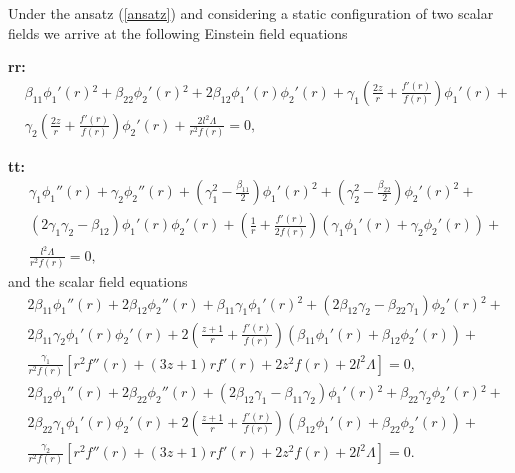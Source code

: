 \documentclass[sn-mathphys,Numbered]{sn-jnl}%
\theoremstyle{thmstyleone}%
\theoremstyle{thmstyletwo}%
\theoremstyle{thmstylethree}%
\begin{document}
Under the ansatz (\ref{ansatz}) and considering a static configuration of two scalar fields we arrive at the following Einstein field equations

\textbf{rr:}
%
\begin{equation}\label{eq rr}
    \begin{aligned}
    &\beta _{11} \phi _1'(r){}^2+\beta _{22} \phi _2'(r){}^2+ 2 \beta _{12}  \phi _1'(r)\phi _2'(r)+\gamma _1  \left(\frac{2 z}{r}+\frac{f'(r)}{f(r)}\right)\phi _1'(r)+\\
    &\gamma _2 \left(\frac{2 z}{r}+\frac{f'(r)}{f(r)}\right)\phi _2'(r)+\frac{2 l^2 \Lambda}{r^2 f(r)}=0,
    \end{aligned}
\end{equation}
%

\textbf{tt:}
\begin{equation}\label{eq tt}
    \begin{aligned}
       &\gamma_1 \phi_1''(r) + \gamma_2 \phi_2''(r) +\left( \gamma_{1}^2 - \frac{\beta_{11}}{2} \right) \phi_{1}'(r)^2 + \left( \gamma_{2}^2 - \frac{\beta_{22}}{2} \right) \phi_{2}'(r)^2+\\
       &\left(2\gamma_1 \gamma_2 - \beta_{12}\right) \phi_1 '(r) \phi_2 '(r) + \left(\frac{1}{r}+\frac{f'(r)}{2 f(r)}\right)\left(\gamma_1\phi _1'(r)+\gamma_2 \phi _2'(r)\right)+\\
       &\frac{l^2 \Lambda}{r^2 f(r)}=0,
    \end{aligned}
\end{equation}
%
and the scalar field equations
%
\begin{equation}\label{scalar eq1}
    \begin{split}
        &2 \beta _{11} \phi _1''(r)+ 2 \beta _{12} \phi _2''(r)+\beta _{11} \gamma _1 \phi _1'(r){}^2+\left(2 \beta _{12} \gamma _2-\beta _{22} \gamma _1\right) \phi _2'(r){}^2+\\
        &2 \beta _{11} \gamma _2 \phi _1'(r)\phi _2'(r) + 2\left(\frac{z+1}{r}+\frac{f'(r)}{f(r)}\right)\left( \beta _{11}\phi _1'(r)+ \beta _{12} \phi _2'(r)\right)+\\
        &\frac{\gamma _1 }{r^2 f(r)}\left[ r^{2} f''(r)+(3z+1) r f'(r)+2 z^2f(r)+2 l^2 \Lambda\right]=0,
    \end{split}
\end{equation}
%
\begin{equation}\label{scalar eq2}
    \begin{split}
        &2 \beta _{12} \phi _1''(r)+ 2 \beta _{22}\phi _2''(r)+\left( 2 \beta _{12} \gamma _1-\beta _{11} \gamma _2\right) \phi _1'(r){}^2+\beta _{22} \gamma _2 \phi _2'(r){}^2+\\
        &2 \beta _{22} \gamma _1 \phi _1'(r)\phi _2'(r) + 2 \left(\frac{z+1}{r}+\frac{f'(r)}{f(r)}\right)\left(\beta _{12} \phi _1'(r)+ \beta _{22} \phi _2'(r)\right)+\\
        &\frac{\gamma _2 }{r^2 f(r)}\left[ r^{2} f''(r)+(3z+1) r f'(r)+2 z^2f(r)+2 l^2 \Lambda\right]=0.
    \end{split}
\end{equation}
\end{document}
